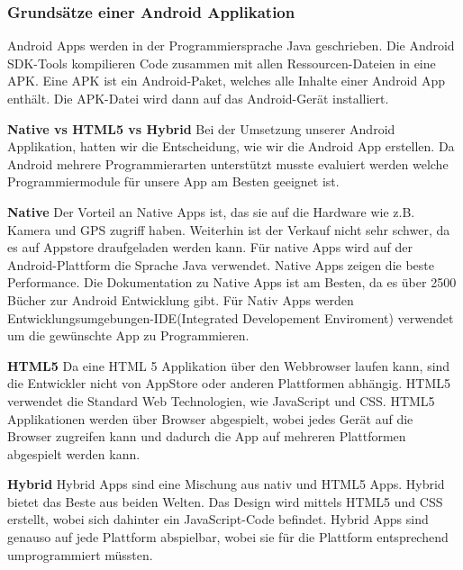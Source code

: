 
\subsubsection{Grundsätze einer Android Applikation}
\label{subsec:aapp-fundam}

Android Apps werden in der Programmiersprache Java geschrieben.
Die Android SDK-Tools kompilieren Code zusammen mit allen Ressourcen-Dateien in eine APK.
Eine APK ist ein Android-Paket, welches alle Inhalte einer Android App enthält. 
Die APK-Datei wird dann auf das Android-Gerät installiert. 


\textbf{Native vs HTML5 vs Hybrid}
Bei der Umsetzung unserer Android Applikation, hatten wir die Entscheidung, wie wir die Android App erstellen. 
Da Android mehrere Programmierarten unterstützt musste evaluiert werden welche Programmiermodule für unsere App am Besten geeignet ist. \nextline

\textbf{Native\newline} 
Der Vorteil an Native Apps ist, das sie auf die Hardware wie z.B. Kamera und GPS zugriff haben. 
Weiterhin ist der Verkauf nicht sehr schwer, da es auf Appstore draufgeladen werden kann. 
Für native Apps wird auf der Android-Plattform die Sprache Java verwendet.
Native Apps zeigen die beste Performance.
Die Dokumentation zu Native Apps ist am Besten, da es über 2500 Bücher zur Android Entwicklung gibt.
Für Nativ Apps werden Entwicklungsumgebungen-IDE(Integrated Developement Enviroment) verwendet um die gewünschte App zu Programmieren.\nextline



\textbf{HTML5\newline} 
Da eine HTML 5 Applikation über den Webbrowser laufen kann, sind die Entwickler nicht von AppStore oder anderen Plattformen abhängig. 
HTML5 verwendet die Standard Web Technologien, wie JavaScript und CSS.
HTML5 Applikationen werden über Browser abgespielt, wobei jedes Gerät auf die Browser zugreifen kann und dadurch die App auf mehreren Plattformen abgespielt werden kann. \nextline

\textbf{Hybrid\newline} 
Hybrid Apps sind eine Mischung aus nativ und HTML5 Apps. Hybrid bietet das Beste aus beiden Welten. Das Design wird mittels HTML5 und CSS erstellt, wobei sich dahinter ein JavaScript-Code befindet. Hybrid Apps sind genauso auf jede Plattform abspielbar, wobei sie für die Plattform entsprechend umprogrammiert müssten.    
\nextline

